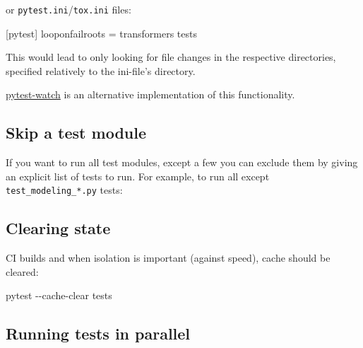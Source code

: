 \documentclass[
]{report}
\newenvironment{Shaded}{\begin{snugshade}}{\end{snugshade}}
\newcommand{\AttributeTok}[1]{\textcolor[rgb]{0.40,0.45,0.13}{#1}}
\newcommand{\DataTypeTok}[1]{\textcolor[rgb]{0.68,0.00,0.00}{#1}}
\newcommand{\ExtensionTok}[1]{\textcolor[rgb]{0.00,0.23,0.31}{#1}}
\newcommand{\FunctionTok}[1]{\textcolor[rgb]{0.28,0.35,0.67}{#1}}
\newcommand{\KeywordTok}[1]{\textcolor[rgb]{0.00,0.23,0.31}{#1}}
\newcommand{\NormalTok}[1]{\textcolor[rgb]{0.00,0.23,0.31}{#1}}
\newcommand{\OtherTok}[1]{\textcolor[rgb]{0.00,0.23,0.31}{#1}}
\newcommand{\PreprocessorTok}[1]{\textcolor[rgb]{0.68,0.00,0.00}{#1}}
\newcommand{\StringTok}[1]{\textcolor[rgb]{0.13,0.47,0.30}{#1}}
\newcommand{\VariableTok}[1]{\textcolor[rgb]{0.07,0.07,0.07}{#1}}
\begin{document}
or \texttt{pytest.ini}/\texttt{tox.ini} files:

\begin{Shaded}
\begin{Highlighting}[]
\KeywordTok{[pytest]}
\DataTypeTok{looponfailroots }\OtherTok{=}\StringTok{ transformers tests}
\end{Highlighting}
\end{Shaded}

This would lead to only looking for file changes in the respective
directories, specified relatively to the ini-file's directory.

\href{https://github.com/joeyespo/pytest-watch}{pytest-watch} is an
alternative implementation of this functionality.

\subsection{Skip a test module}\label{skip-a-test-module}

If you want to run all test modules, except a few you can exclude them
by giving an explicit list of tests to run. For example, to run all
except \texttt{test\_modeling\_*.py} tests:

\begin{Shaded}
\end{Shaded}

\subsection{Clearing state}\label{clearing-state}

CI builds and when isolation is important (against speed), cache should
be cleared:

\begin{Shaded}
\begin{Highlighting}[]
\ExtensionTok{pytest} \AttributeTok{{-}{-}cache{-}clear}\NormalTok{ tests}
\end{Highlighting}
\end{Shaded}

\subsection{Running tests in parallel}\label{running-tests-in-parallel}
\end{document}
